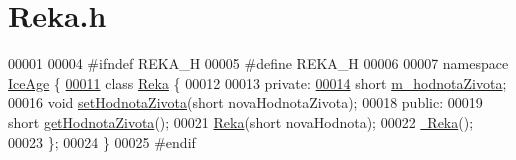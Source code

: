 \hypertarget{Reka_8h_source}{}\section{Reka.\+h}
\label{Reka_8h_source}

\begin{DoxyCode}
00001 
00004 \textcolor{preprocessor}{#ifndef REKA\_H}
00005 \textcolor{preprocessor}{#define REKA\_H}
00006 
00007 \textcolor{keyword}{namespace }\hyperlink{namespaceIceAge}{IceAge} \{
\hypertarget{Reka_8h_source.tex_l00011}{}\hyperlink{classIceAge_1_1Reka}{00011}     \textcolor{keyword}{class }\hyperlink{classIceAge_1_1Reka}{Reka} \{
00012 
00013     \textcolor{keyword}{private}:
\hypertarget{Reka_8h_source.tex_l00014}{}\hyperlink{classIceAge_1_1Reka_acc162b1ee9e0678f92750a7e972460fa}{00014}         \textcolor{keywordtype}{short} \hyperlink{classIceAge_1_1Reka_acc162b1ee9e0678f92750a7e972460fa}{m\_hodnotaZivota};
00016         \textcolor{keywordtype}{void} \hyperlink{classIceAge_1_1Reka_a42bce1e2ee5f7249ee9800ca6058aab6}{setHodnotaZivota}(\textcolor{keywordtype}{short} novaHodnotaZivota);
00018     \textcolor{keyword}{public}:
00019         \textcolor{keywordtype}{short} \hyperlink{classIceAge_1_1Reka_acc4d9a4ef69da03eed8762e16a33b49f}{getHodnotaZivota}();
00021         \hyperlink{classIceAge_1_1Reka_ac851511c842c8d8aa746be21562fd9c4}{Reka}(\textcolor{keywordtype}{short} novaHodnota);
00022         \hyperlink{classIceAge_1_1Reka_a7d29458f88fcd62378c9178b81ec2c51}{~Reka}();
00023     \};
00024 \}
00025 \textcolor{preprocessor}{#endif}
\end{DoxyCode}
